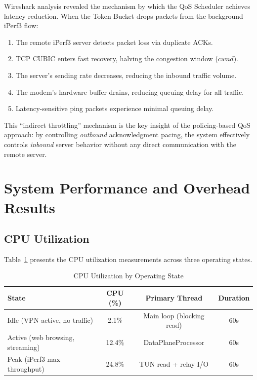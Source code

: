 Wireshark analysis revealed the mechanism by which the QoS Scheduler achieves latency reduction. When the Token Bucket drops packets from the background iPerf3 flow:

\begin{enumerate}[noitemsep]
    \item The remote iPerf3 server detects packet loss via duplicate ACKs.
    \item TCP CUBIC enters fast recovery, halving the congestion window ($cwnd$).
    \item The server's sending rate decreases, reducing the inbound traffic volume.
    \item The modem's hardware buffer drains, reducing queuing delay for all traffic.
    \item Latency-sensitive ping packets experience minimal queuing delay.
\end{enumerate}

This ``indirect throttling'' mechanism is the key insight of the policing-based QoS approach: by controlling \textit{outbound} acknowledgment pacing, the system effectively controls \textit{inbound} server behavior without any direct communication with the remote server.

\section{System Performance and Overhead Results}
\label{sec:results_overhead}

\subsection{CPU Utilization}

Table~\ref{tab:cpu_results} presents the CPU utilization measurements across three operating states.

\begin{table}[H]
\centering
\caption{CPU Utilization by Operating State}
\label{tab:cpu_results}
\begin{tabular}{lccc}
\toprule
\textbf{State} & \textbf{CPU (\%)} & \textbf{Primary Thread} & \textbf{Duration} \\
\midrule
Idle (VPN active, no traffic)   & 2.1\%  & Main loop (blocking read) & 60s \\
Active (web browsing, streaming) & 12.4\% & DataPlaneProcessor        & 60s \\
Peak (iPerf3 max throughput)     & 24.8\% & TUN read + relay I/O      & 60s \\
\bottomrule
\end{tabular}
\end{table}


